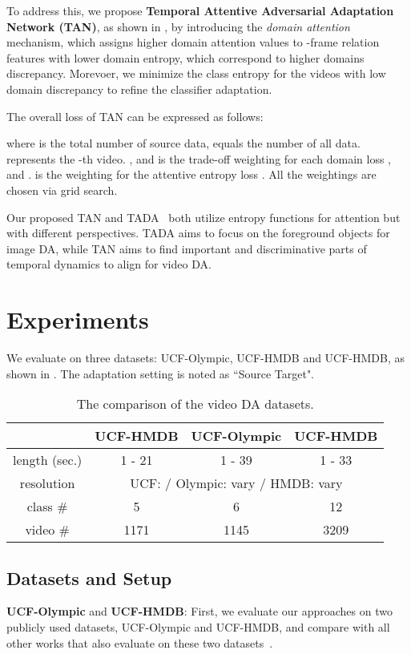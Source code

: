 \documentclass[10pt,twocolumn,letterpaper]{article}
\begin{document}
To address this, we propose \textbf{Temporal Attentive Adversarial Adaptation Network (TAN)}, as shown in , by introducing the \textit{domain attention} mechanism, which assigns higher domain attention values to -frame relation features with lower domain entropy, which correspond to higher domains discrepancy. Morevoer, we minimize the class entropy for the videos with low domain discrepancy to refine the classifier adaptation.

The overall loss of TAN can be expressed as follows:

where  is the total number of source data,  equals the number of all data.  represents the -th video. ,  and  is the trade-off weighting for each domain loss ,  and .  is the weighting for the attentive entropy loss . All the weightings are chosen via grid search. 

Our proposed TAN and TADA~\cite{wang2019transferable} both utilize entropy functions for attention but with different perspectives. TADA aims to focus on the foreground objects for image DA, while TAN aims to find important and discriminative parts of temporal dynamics to align for video DA.

\section{Experiments}
We evaluate on three datasets: UCF-Olympic, UCF-HMDB and UCF-HMDB, as shown in . The adaptation setting is noted as ``Source  Target". 

\begin{table}[!t]
\centering
\scriptsize
    \begin{tabular}{c|c|c|c}
     & UCF-HMDB & UCF-Olympic & UCF-HMDB \\ \hline
    length (sec.) & 1 - 21 & 1 - 39 & 1 - 33 \\ \hline
    resolution & \multicolumn{3}{c}{UCF:  / Olympic: vary / HMDB: vary} \\ \hline
    class \# & 5 & 6 & 12 \\ \hline
    video \# & 1171 & 1145 & 3209 \\ \hline
    \end{tabular}
\caption{The comparison of the video DA datasets.}
\label{table:dataset}
\end{table}

\subsection{Datasets and Setup}
\noindent\textbf{UCF-Olympic} and \textbf{UCF-HMDB}:
First, we evaluate our approaches on two publicly used datasets, UCF-Olympic and UCF-HMDB, and compare with all other works that also evaluate on these two datasets~\cite{sultani2014human, xu2016dual, jamal2018deep}. 
\end{document}
